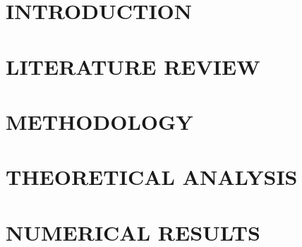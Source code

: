 \documentclass[a4paper,13pt,3p,twoside]{report}
\theoremstyle{definition}
\begin{document}
\renewcommand{\listtablename}{LIST OF TABLES}
{\let\oldnumberline\numberline
\renewcommand{\numberline}{Table~\oldnumberline}
\listoftables}

\glsaddall 
\renewcommand*{\acronymname}{LIST OF ABBREVIATIONS}
\renewcommand*{\entryname}{Abbreviation}
\renewcommand*{\descriptionname}{Definition}
\printnoidxglossaries

\renewcommand\appendixname{APPENDIX}
\renewcommand\appendixpagename{APPENDIX}
\renewcommand\appendixtocname{APPENDIX}

\renewcommand{\figurename}{Figure}
\renewcommand{\tablename}{Table}
\renewcommand{\chaptername}{CHAPTER}



\newpage
{}

\pagestyle{fancy}
\fancyhf{}
\fancyhead[RE, LO]{\leftmark}
\fancyfoot[RE, LO]{\thepage}

\chapter{INTRODUCTION}

\newpage
\chapter{LITERATURE REVIEW}



\newpage
\chapter{METHODOLOGY}


\newpage
\chapter{THEORETICAL ANALYSIS}


\newpage
\chapter{NUMERICAL RESULTS}

\end{document}
